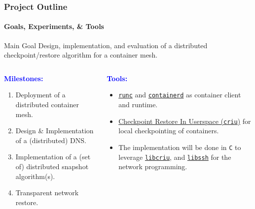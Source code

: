 \documentclass[9pt,    %
    english,            %
    xcolor=table,       %
    envcountsect,        %
    aspectratio=169     %
]{beamer}
\begin{document}
\begin{frame}
    \frametitle{Project Outline}
    \framesubtitle{Goals, Experiments, \& Tools}

    \vspace{-25pt}
    \begin{alertblock}{Main Goal}
        Design, implementation, and evaluation of a distributed checkpoint/restore algorithm for a container mesh.
    \end{alertblock}

    \begin{columns}[t]
        \begin{column}{.45\textwidth}
            \textbf{\textcolor{blue}{Milestones:}}
            \begin{enumerate}
                \item Deployment of a distributed container mesh.
                \item Design \& Implementation of a (distributed) DNS.
                \item Implementation of a (set of) distributed snapshot algorithm(s).
                \item Transparent network restore.
            \end{enumerate}
        \end{column} \hfill
        \begin{column}{.45\textwidth}
            \textbf{\textcolor{blue}{Tools:}}
            \begin{itemize}
                \item \href{https://github.com/opencontainers/runc}{\texttt{runc}} and \href{https://containerd.io/}{\texttt{containerd}} as container client and runtime.
                \item \href{https://criu.org/Main_Page}{Checkpoint Restore In Userspace (\texttt{criu})} for local checkpointing of containers.
                \item The implementation will be done in \texttt{C} to leverage \href{https://criu.org/C_API}{\texttt{libcriu}}, and \href{http://www.libssh.org/}{\texttt{libssh}} for the network programming.
            \end{itemize}
        \end{column}
    \end{columns}
\end{frame}
\end{document}
